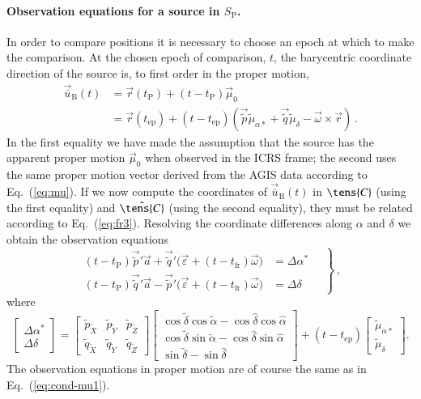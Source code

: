 \documentclass[structabstract]{aa}
\begin{document}
\paragraph{Observation equations for a source in $S_\text{P}$.}
In order to compare positions it is necessary to choose an epoch at which
to make the comparison. At the chosen epoch of comparison, $t$, the
barycentric coordinate direction of the source is, to first order in the
proper motion,
\begin{align}\label{eq:fr-ubar}
\vec{\bar{u}}_\text{B}(t) &= \vec{r}(t_\text{P})+(t-t_\text{P})\vec{\mu}_0
\nonumber \\[3pt]
&=\vec{r}(t_\text{ep})+(t-t_\text{ep})
\left(\vec{\tilde{p}}\tilde{\mu}_{\alpha*} + \vec{\tilde{q}}\tilde{\mu}_\delta 
- \vec{\omega}\times\vec{r}\right) \, .
\end{align}
In the first equality we have made the assumption that the source
has the apparent proper motion $\vec{\mu}_0$ when observed in the 
ICRS frame; the second uses the same proper motion vector derived from 
the AGIS data according to Eq.~(\ref{eq:mu}). If we now compute the
coordinates of $\vec{\bar{u}}_\text{B}(t)$ in $\tens{C}$ (using the first
equality) and $\tilde{\tens{C}}$ (using the second equality), they must be
related according to Eq.~(\ref{eq:fr3}). Resolving the coordinate differences
along $\alpha$ and $\delta$ we obtain the observation equations
\begin{equation}\label{eq:cond-Delta}
\left. \begin{aligned}
(t-t_\text{P})\vec{\tilde{p}}'\vec{a}+
\vec{\tilde{q}}'\big(\vec{\varepsilon}+(t-t_\text{fr})\vec{\omega}\big)
&= \Delta\alpha^* \\[3pt]
(t-t_\text{P})\vec{\tilde{q}}'\vec{a}-
\vec{\tilde{p}}'\big(\vec{\varepsilon}+(t-t_\text{fr})\vec{\omega}\big)
&= \Delta\delta
\end{aligned}
\quad\right\} \, ,
\end{equation}
where 
\begin{equation}\label{eq:fr-Delta}
\begin{bmatrix} \Delta\alpha^*\\ \Delta\delta \end{bmatrix}
= 
\begin{bmatrix} 
\tilde{p}_{\tilde{X}} & \tilde{p}_{\tilde{Y}} & \tilde{p}_{\tilde{Z}}\\ 
\tilde{q}_{\tilde{X}} & \tilde{q}_{\tilde{Y}} & \tilde{q}_{\tilde{Z}}
\end{bmatrix}
\begin{bmatrix} 
\cos\tilde{\delta}\cos\tilde{\alpha} - \cos\hat{\delta}\cos\hat{\alpha}\\ 
\cos\tilde{\delta}\sin\tilde{\alpha} - \cos\hat{\delta}\sin\hat{\alpha}\\ 
\sin\tilde{\delta} - \sin\hat{\delta}
\end{bmatrix}
+ (t-t_\text{ep})
\begin{bmatrix} \tilde{\mu}_{\alpha*}\\ \tilde{\mu}_\delta \end{bmatrix} .
\end{equation}
The observation equations in proper motion are of course the same as in
Eq.~(\ref{eq:cond-mu1}).
\end{document}
